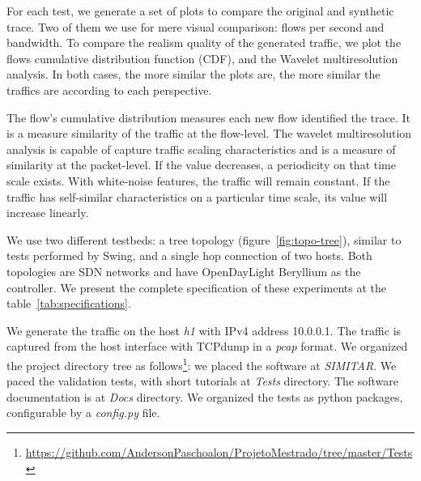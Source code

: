 For each test, we generate a set of plots to compare the original and synthetic trace. Two of them we use for mere visual comparison:  flows per second and bandwidth. To compare the realism quality of the generated traffic, we plot the flows cumulative distribution function (CDF)\cite{harpoon-paper}, and the Wavelet multiresolution analysis.  In both cases, the more similar the plots are, the more similar the traffics are according to each perspective. 

The flow's cumulative distribution measures each new flow identified the trace. It is a measure similarity of the traffic at the flow-level.  The wavelet multiresolution analysis is capable of capture traffic scaling characteristics and is a measure of similarity at the packet-level. If the value decreases, a periodicity on that time scale exists. With white-noise features, the traffic will remain constant. If the traffic has self-similar characteristics on a particular time scale, its value will increase linearly.

We use two different testbeds: a tree topology (figure~\ref{fig:topo-tree}), similar to tests performed by Swing\cite{swing-paper}\cite{background-traffic-matter}\cite{legotg-paper}, and a single hop connection of two hosts. Both topologies are SDN networks and have OpenDayLight Beryllium as the controller.  We present the complete specification of these experiments at the table~\ref{tab:specifications}.
	
We generate the traffic on the host \textit{h1} with IPv4 address 10.0.0.1. The traffic is captured from the host interface with TCPdump in a \textit{pcap} format.  We organized the project directory tree as follows\footnote{ \href{https://github.com/AndersonPaschoalon/ProjetoMestrado/tree/master/Tests}{https://github.com/AndersonPaschoalon/ProjetoMestrado/tree/master/Tests} }: we placed the software at \textit{SIMITAR}. We paced the validation tests, with short tutorials at \textit{Tests} directory. The software documentation is at \textit{Docs} directory. We organized the tests as python packages, configurable by a \textit{config.py} file.


